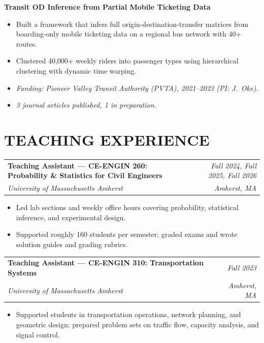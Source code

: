 \documentclass[10pt, a4paper]{article}
\makeatletter
\newcommand{\entry}[4]{%
  \noindent
  \begin{tabularx}{\linewidth}{@{}X@{\hspace{4pt}}r@{}}
    \textbf{#1} & \textit{\small\color{subtle}#2} \\
    \textit{\small\color{subtle}#3} & \textit{\small\color{subtle}#4}
  \end{tabularx}\vspace{2pt}%
}
\makeatother
\begin{document}
\vspace{4pt}
\textbf{Transit OD Inference from Partial Mobile Ticketing Data}
\begin{itemize}
  \item Built a framework that infers full origin-destination-transfer matrices from boarding-only mobile ticketing data on a regional bus network with 40+ routes.
  \item Clustered 40,000+ weekly riders into passenger types using hierarchical clustering with dynamic time warping.
  \item \textit{Funding: Pioneer Valley Transit Authority (PVTA), 2021--2023 (PI: J.~Oke).}
  \item \textit{3 journal articles published, 1 in preparation.}  
\end{itemize}

\section{TEACHING EXPERIENCE}

\entry{Teaching Assistant --- CE-ENGIN 260: Probability \& Statistics for Civil Engineers}{Fall 2024, Fall 2025, Fall 2026}
      {University of Massachusetts Amherst}{Amherst, MA}
\begin{itemize}
  \item Led lab sections and weekly office hours covering probability, statistical inference, and experimental design.
  \item Supported roughly 160 students per semester; graded exams and wrote solution guides and grading rubrics.
\end{itemize}

\vspace{4pt}
\entry{Teaching Assistant --- CE-ENGIN 310: Transportation Systems}{Fall 2023}
      {University of Massachusetts Amherst}{Amherst, MA}
\begin{itemize}
  \item Supported students in transportation operations, network planning, and geometric design; prepared problem sets on traffic flow, capacity analysis, and signal control.
\end{itemize}
\end{document}
